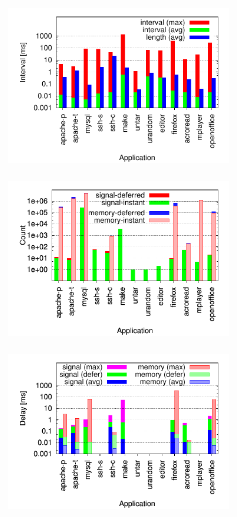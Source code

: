   \begin{figure}
  \begin{minipage}[b]{0.33\linewidth}
    \centering
    \includegraphics[width=2.3in]{figures/scribe/syncpts2}
    \vskip -0.21in
    \vskip 0.2in
    \label{scribe:fig:syncpts}
  \end{minipage}
  \begin{minipage}[b]{0.33\linewidth}
    \centering
    \includegraphics[width=2.3in]{figures/scribe/stats}
    \vskip -0.21in
    \vskip 0.2in
    \label{scribe:fig:stats}
  \end{minipage}
  \begin{minipage}[b]{0.33\linewidth}
    \centering
    \includegraphics[width=2.3in]{figures/scribe/delays2}
    \vskip -0.21in
    \vskip 0.2in
    \label{scribe:fig:delays}
  \end{minipage}
  \vskip -0.3in
\end{figure}

